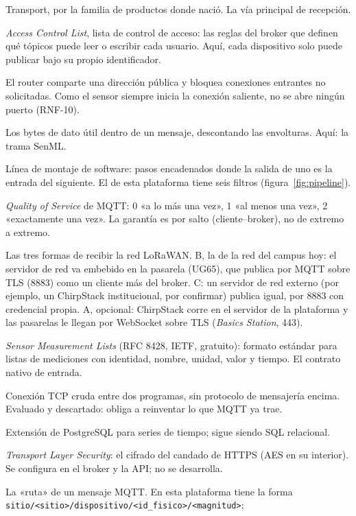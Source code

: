 \begin{description}
{Transport}, por la familia de productos donde nació. La vía principal de recepción.
\item[ACL] \emph{Access Control List}, lista de control de acceso: las reglas del broker que
definen qué tópicos puede leer o escribir cada usuario. Aquí, cada dispositivo solo puede publicar
bajo su propio identificador.
\item[NAT y puertos] El router comparte una dirección pública y bloquea conexiones entrantes no
solicitadas. Como el sensor siempre inicia la conexión saliente, no se abre ningún puerto (RNF-10).
\item[Payload] Los bytes de dato útil dentro de un mensaje, descontando las envolturas. Aquí: la
trama SenML.
\item[Pipeline] Línea de montaje de software: pasos encadenados donde la salida de uno es la entrada
del siguiente. El de esta plataforma tiene seis filtros (figura~\ref{fig:pipeline}).
\item[QoS] \emph{Quality of Service} de MQTT: 0 «a lo más una vez», 1 «al menos una vez», 2
«exactamente una vez». La garantía es por salto (cliente–broker), no de extremo a extremo.
\item[Rutas A, B y C] Las tres formas de recibir la red LoRaWAN. B, la de la red del campus hoy: el servidor de red va embebido en la pasarela (UG65), que
publica por MQTT sobre TLS (8883) como un cliente más del broker. C: un servidor de red externo (por ejemplo, un
ChirpStack institucional, por confirmar) publica igual, por 8883 con credencial propia. A, opcional:
ChirpStack corre en el servidor de la plataforma y las pasarelas le llegan por WebSocket sobre TLS (\emph{Basics Station}, 443).
\item[SenML] \emph{Sensor Measurement Lists} (RFC 8428, IETF, gratuito): formato estándar para
listas de mediciones con identidad, nombre, unidad, valor y tiempo. El contrato nativo de entrada.
\item[Socket] Conexión TCP cruda entre dos programas, sin protocolo de mensajería encima. Evaluado y
descartado: obliga a reinventar lo que MQTT ya trae.
\item[TimescaleDB] Extensión de PostgreSQL para series de tiempo; sigue siendo SQL relacional.
\item[TLS] \emph{Transport Layer Security}: el cifrado del candado de HTTPS (AES en su interior).
Se configura en el broker y la API; no se desarrolla.
\item[Tópico] La «ruta» de un mensaje MQTT. En esta plataforma tiene la forma
\texttt{sitio/\textless sitio\textgreater/dispositivo/\textless id\_fisico\textgreater/\textless magnitud\textgreater};

\end{description}
